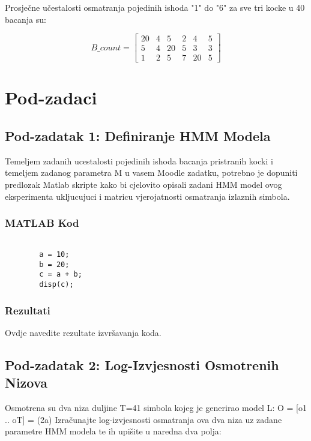 \documentclass[12pt]{article}
\begin{document}
	
	Prosječne učestalosti osmatranja pojedinih ishoda "1" do "6" za sve tri kocke u 40 bacanja su:
	
	\begin{equation}
		B\_count =\begin{bmatrix}
			20 & 4 & 5 & 2 & 4 & 5 \\
			5  & 4 & 20 & 5 & 3 & 3 \\
			1  & 2 & 5 & 7 & 20 & 5
		\end{bmatrix}
	\end{equation}
	
	
	\section{Pod-zadaci}
	
	\subsection{Pod-zadatak 1: Definiranje HMM Modela}
	Temeljem zadanih ucestalosti pojedinih ishoda bacanja pristranih kocki i temeljem zadanog parametra M u vasem Moodle zadatku,
	potrebno je dopuniti predlozak Matlab skripte kako bi cjelovito opisali zadani HMM model ovog eksperimenta ukljucujuci i matricu
	vjerojatnosti osmatranja izlaznih simbola.
	
	\subsubsection*{MATLAB Kod}
	\begin{lstlisting}
		
		a = 10;
		b = 20;
		c = a + b;
		disp(c);
	\end{lstlisting}
	
	\subsubsection*{Rezultati}
	Ovdje navedite rezultate izvršavanja koda.
	

	
	\subsection{Pod-zadatak 2: Log-Izvjesnosti Osmotrenih Nizova}
	Osmotrena su dva niza duljine T=41 simbola kojeg je generirao model L:\newline
	O = [o1 .. oT] = \newline
	[ 3 6 6 4 5 1 2 3 5 4 4 5 5 3 1 6 1 5 3 5 5 5 4 5 5 5 6 5 1 6 1 3 3 3 3 3 6 3 4 1 3]\newline 
	[ 2 2 3 5 3 6 3 4 4 4 4 1 4 6 1 4 2 6 4 1 4 3 2 5 6 6 6 4 6 6 2 6 6 3 4 4 4 2 3 4 2]\newline
	(2a) Izračunajte log-izvjesnosti osmatranja ova dva niza uz zadane parametre HMM modela te ih upišite u naredna dva polja:
	
\end{document}
